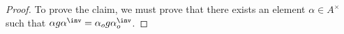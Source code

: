 \begin{proof}



	\begin{comment}
	At this point, we do not know if $\Lambda$ is a \emph{congruence} subgroup of $\Gamma$. That is, we do not know if $\Lambda = A^1 \cap \prod_{\pfrak} \Clo_\pfrak(\Lambda) = \Lambda$ (product taken inside $(A\otimes \Abb_k)^1$)

	(Equivalently, we do not know if $\Gamma(J) \leq \Lambda$ for some ideal $J$ of $R$)
	\end{comment}

	To prove the claim, we must prove that there exists an element $\alpha \in A^\times $ such that $\alpha g \alpha^\inv =  \alpha_o g \alpha_o^\inv$.














\end{proof}